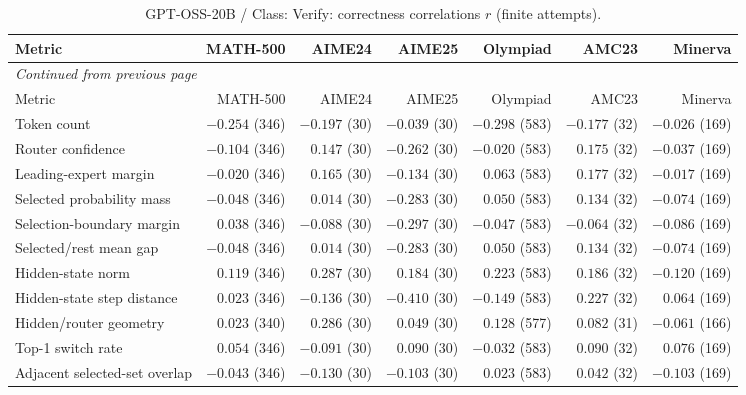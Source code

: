 \begingroup\scriptsize\setlength{\tabcolsep}{4pt}
\begin{longtable}{@{}lrrrrrr@{}}
\caption{GPT-OSS-20B / Class: Verify: correctness correlations $r$ (finite attempts).}\label{tab:multi-gptoss-class-Verify}\\
\toprule
Metric & MATH-500 & AIME24 & AIME25 & Olympiad & AMC23 & Minerva \\
\midrule\endfirsthead
\multicolumn{7}{l}{\textit{Continued from previous page}}\\
\toprule
Metric & MATH-500 & AIME24 & AIME25 & Olympiad & AMC23 & Minerva \\
\midrule\endhead
\bottomrule\endfoot
Token count & $-0.254$ (346) & $-0.197$ (30) & $-0.039$ (30) & $-0.298$ (583) & $-0.177$ (32) & $-0.026$ (169) \\
Router confidence & $-0.104$ (346) & $0.147$ (30) & $-0.262$ (30) & $-0.020$ (583) & $0.175$ (32) & $-0.037$ (169) \\
Leading-expert margin & $-0.020$ (346) & $0.165$ (30) & $-0.134$ (30) & $0.063$ (583) & $0.177$ (32) & $-0.017$ (169) \\
Selected probability mass & $-0.048$ (346) & $0.014$ (30) & $-0.283$ (30) & $0.050$ (583) & $0.134$ (32) & $-0.074$ (169) \\
Selection-boundary margin & $0.038$ (346) & $-0.088$ (30) & $-0.297$ (30) & $-0.047$ (583) & $-0.064$ (32) & $-0.086$ (169) \\
Selected/rest mean gap & $-0.048$ (346) & $0.014$ (30) & $-0.283$ (30) & $0.050$ (583) & $0.134$ (32) & $-0.074$ (169) \\
Hidden-state norm & $0.119$ (346) & $0.287$ (30) & $0.184$ (30) & $0.223$ (583) & $0.186$ (32) & $-0.120$ (169) \\
Hidden-state step distance & $0.023$ (346) & $-0.136$ (30) & $-0.410$ (30) & $-0.149$ (583) & $0.227$ (32) & $0.064$ (169) \\
Hidden/router geometry & $0.023$ (340) & $0.286$ (30) & $0.049$ (30) & $0.128$ (577) & $0.082$ (31) & $-0.061$ (166) \\
Top-1 switch rate & $0.054$ (346) & $-0.091$ (30) & $0.090$ (30) & $-0.032$ (583) & $0.090$ (32) & $0.076$ (169) \\
Adjacent selected-set overlap & $-0.043$ (346) & $-0.130$ (30) & $-0.103$ (30) & $0.023$ (583) & $0.042$ (32) & $-0.103$ (169) \\
\end{longtable}\endgroup


